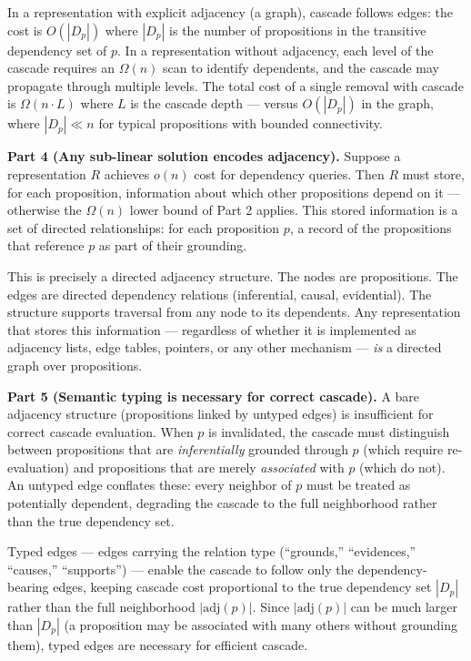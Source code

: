 \documentclass[
]{article}
\begin{document}
In a representation with explicit adjacency (a graph), cascade follows
edges: the cost is \(O(|D_p|)\) where \(|D_p|\) is the number of
propositions in the transitive dependency set of \(p\). In a
representation without adjacency, each level of the cascade requires an
\(\Omega(n)\) scan to identify dependents, and the cascade may propagate
through multiple levels. The total cost of a single removal with cascade
is \(\Omega(n \cdot L)\) where \(L\) is the cascade depth --- versus
\(O(|D_p|)\) in the graph, where \(|D_p| \ll n\) for typical
propositions with bounded connectivity.

\textbf{Part 4 (Any sub-linear solution encodes adjacency).} Suppose a
representation \(R\) achieves \(o(n)\) cost for dependency queries. Then
\(R\) must store, for each proposition, information about which other
propositions depend on it --- otherwise the \(\Omega(n)\) lower bound of
Part 2 applies. This stored information is a set of directed
relationships: for each proposition \(p\), a record of the propositions
that reference \(p\) as part of their grounding.

This is precisely a directed adjacency structure. The nodes are
propositions. The edges are directed dependency relations (inferential,
causal, evidential). The structure supports traversal from any node to
its dependents. Any representation that stores this information ---
regardless of whether it is implemented as adjacency lists, edge tables,
pointers, or any other mechanism --- \emph{is} a directed graph over
propositions.

\textbf{Part 5 (Semantic typing is necessary for correct cascade).} A
bare adjacency structure (propositions linked by untyped edges) is
insufficient for correct cascade evaluation. When \(p\) is invalidated,
the cascade must distinguish between propositions that are
\emph{inferentially} grounded through \(p\) (which require
re-evaluation) and propositions that are merely \emph{associated} with
\(p\) (which do not). An untyped edge conflates these: every neighbor of
\(p\) must be treated as potentially dependent, degrading the cascade to
the full neighborhood rather than the true dependency set.

Typed edges --- edges carrying the relation type (``grounds,''
``evidences,'' ``causes,'' ``supports'') --- enable the cascade to
follow only the dependency-bearing edges, keeping cascade cost
proportional to the true dependency set \(|D_p|\) rather than the full
neighborhood \(|\text{adj}(p)|\). Since \(|\text{adj}(p)|\) can be much
larger than \(|D_p|\) (a proposition may be associated with many others
without grounding them), typed edges are necessary for efficient cascade.
\end{document}
